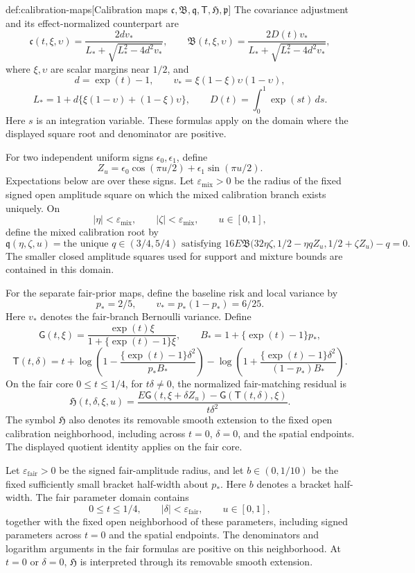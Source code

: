 \documentclass[11pt]{article}
\begin{document}
\begin{definitionv}{def:calibration-maps}[Calibration maps $\mathfrak c,\mathfrak B,\mathfrak q,\mathsf T,\mathfrak H,\mathfrak p$]
The covariance adjustment and its effect-normalized counterpart are
\[
\mathfrak c(t,\xi,\upsilon)
=\frac{2dv_*}{L_*+\sqrt{L_*^2-4d^2v_*}},\qquad
\mathfrak B(t,\xi,\upsilon)
=\frac{2D(t)v_*}{L_*+\sqrt{L_*^2-4d^2v_*}},
\]
where \(\xi,\upsilon\) are scalar margins near \(1/2\), and
\[
d=\exp(t)-1,\qquad
v_*=\xi(1-\xi)\upsilon(1-\upsilon),
\]
\[
L_*=1+d\{\xi(1-\upsilon)+(1-\xi)\upsilon\},\qquad
D(t)=\int_0^1\exp(st)\,ds.
\]
Here \(s\) is an integration variable. These formulas apply on the domain where the displayed square root and denominator are positive.

For two independent uniform signs \(\epsilon_0,\epsilon_1\), define
\[
Z_u=\epsilon_0\cos(\pi u/2)+\epsilon_1\sin(\pi u/2).
\]
Expectations below are over these signs. Let \(\varepsilon_{\mathrm{mix}}>0\) be the radius of the fixed signed open amplitude square on which the mixed calibration branch exists uniquely. On
\[
|\eta|<\varepsilon_{\mathrm{mix}},\qquad
|\zeta|<\varepsilon_{\mathrm{mix}},\qquad
u\in[0,1],
\]
define the mixed calibration root by
\[
\mathfrak q(\eta,\zeta,u)
=
\text{the unique }q\in(3/4,5/4)
\text{ satisfying }
16E\mathfrak B
\bigl(32\eta\zeta,1/2-\eta qZ_u,1/2+\zeta Z_u\bigr)-q=0.
\]
The smaller closed amplitude squares used for support and mixture bounds are contained in this domain.

For the separate fair-prior maps, define the baseline risk and local variance by
\[
p_*=2/5,\qquad v_*=p_*(1-p_*)=6/25.
\]
Here \(v_*\) denotes the fair-branch Bernoulli variance. Define
\[
\mathsf G(t,\xi)
=\frac{\exp(t)\xi}{1+\{\exp(t)-1\}\xi},\qquad
B_*=1+\{\exp(t)-1\}p_*,
\]
\[
\mathsf T(t,\delta)
=t+
\log\left(1-\frac{\{\exp(t)-1\}\delta^2}{p_*B_*}\right)
-\log\left(1+\frac{\{\exp(t)-1\}\delta^2}{(1-p_*)B_*}\right).
\]
On the fair core \(0\le t\le1/4\), for \(t\delta\ne0\), the normalized fair-matching residual is
\[
\mathfrak H(t,\delta,\xi,u)
=
\frac{
E\mathsf G(t,\xi+\delta Z_u)
-\mathsf G(\mathsf T(t,\delta),\xi)
}{t\delta^2}.
\]
The symbol \(\mathfrak H\) also denotes its removable smooth extension to the fixed open calibration neighborhood, including across \(t=0\), \(\delta=0\), and the spatial endpoints. The displayed quotient identity applies on the fair core.

Let \(\varepsilon_{\mathrm{fair}}>0\) be the signed fair-amplitude radius, and let \(b\in(0,1/10)\) be the fixed sufficiently small bracket half-width about \(p_*\). Here \(b\) denotes a bracket half-width. The fair parameter domain contains
\[
0\le t\le1/4,\qquad
|\delta|<\varepsilon_{\mathrm{fair}},\qquad
u\in[0,1],
\]
together with the fixed open neighborhood of these parameters, including signed parameters across \(t=0\) and the spatial endpoints. The denominators and logarithm arguments in the fair formulas are positive on this neighborhood. At \(t=0\) or \(\delta=0\), \(\mathfrak H\) is interpreted through its removable smooth extension.


\end{definitionv}
\end{document}
